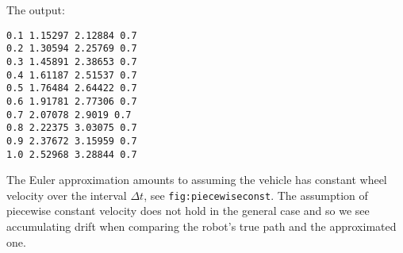 \hypertarget{listDDstepwrapper}{%
\label{listDDstepwrapper}}%
\begin{Shaded}
\begin{Highlighting}[]
\OperatorTok{=} \OperatorTok{;}\OperatorTok{=} \OperatorTok{;}\OperatorTok{=} 
\OperatorTok{=} \OperatorTok{;}\OperatorTok{=} 
\OperatorTok{=} \OperatorTok{:}
   \OperatorTok{,}\OperatorTok{,}\OperatorTok{,}\OperatorTok{,}
\OperatorTok{,}\OperatorTok{,}\OperatorTok{=}\OperatorTok{,}\OperatorTok{,}\OperatorTok{,}\OperatorTok{,}\OperatorTok{,}\OperatorTok{,}\OperatorTok{,}\NormalTok{)}
\OperatorTok{=}\OperatorTok{+}
\OperatorTok{,}\OperatorTok{=}\NormalTok{)}\OperatorTok{,} \OperatorTok{,}\OperatorTok{,}\OperatorTok{=}\NormalTok{)}\OperatorTok{,} \OperatorTok{,}\OperatorTok{,}\OperatorTok{=}\NormalTok{)}\OperatorTok{,} \OperatorTok{,}\OperatorTok{,}\OperatorTok{=}\NormalTok{))}
\end{Highlighting}
\end{Shaded}

The output:

\begin{verbatim}
0.1 1.15297 2.12884 0.7
0.2 1.30594 2.25769 0.7
0.3 1.45891 2.38653 0.7
0.4 1.61187 2.51537 0.7
0.5 1.76484 2.64422 0.7
0.6 1.91781 2.77306 0.7
0.7 2.07078 2.9019 0.7
0.8 2.22375 3.03075 0.7
0.9 2.37672 3.15959 0.7
1.0 2.52968 3.28844 0.7
\end{verbatim}

The Euler approximation amounts to assuming the vehicle has constant
wheel velocity over the interval \(\Delta t\), see
\texttt{fig:piecewiseconst}. The assumption of piecewise constant
velocity does not hold in the general case and so we see accumulating
drift when comparing the robot's true path and the approximated one.


